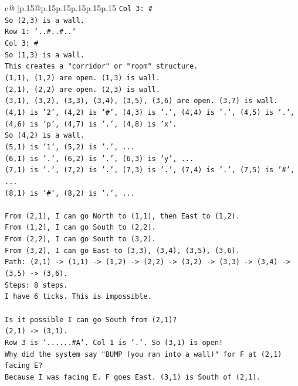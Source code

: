 \documentclass{article}
\begin{document}
{\begin{supertabular}{c@{$\;$}|p{.15\linewidth}@{}p{.15\linewidth}p{.15\linewidth}p{.15\linewidth}p{.15\linewidth}p{.15\linewidth}}
{{{\texttt{Col 3: \#} \\
\texttt{So (2,3) is a wall.} \\
\texttt{Row 1: `..\#..\#..`} \\
\texttt{Col 3: \#} \\
\texttt{So (1,3) is a wall.} \\
\texttt{This creates a "corridor" or "room" structure.} \\
\texttt{(1,1), (1,2) are open. (1,3) is wall.} \\
\texttt{(2,1), (2,2) are open. (2,3) is wall.} \\
\texttt{(3,1), (3,2), (3,3), (3,4), (3,5), (3,6) are open. (3,7) is wall.} \\
\texttt{(4,1) is '2', (4,2) is '\#', (4,3) is '.', (4,4) is '.', (4,5) is '.', (4,6) is 'p', (4,7) is '.', (4,8) is 'x'.} \\
\texttt{So (4,2) is a wall.} \\
\texttt{(5,1) is '1', (5,2) is '.', ...} \\
\texttt{(6,1) is '.', (6,2) is '.', (6,3) is 'y', ...} \\
\texttt{(7,1) is '.', (7,2) is '.', (7,3) is '.', (7,4) is '.', (7,5) is '\#', ...} \\
\texttt{(8,1) is '\#', (8,2) is '.', ...} \\
\\ 
\texttt{From (2,1), I can go North to (1,1), then East to (1,2).} \\
\texttt{From (1,2), I can go South to (2,2).} \\
\texttt{From (2,2), I can go South to (3,2).} \\
\texttt{From (3,2), I can go East to (3,3), (3,4), (3,5), (3,6).} \\
\texttt{Path: (2,1) {-}> (1,1) {-}> (1,2) {-}> (2,2) {-}> (3,2) {-}> (3,3) {-}> (3,4) {-}> (3,5) {-}> (3,6).} \\
\texttt{Steps: 8 steps.} \\
\texttt{I have 6 ticks. This is impossible.} \\
\\ 
\texttt{Is it possible I can go South from (2,1)?} \\
\texttt{(2,1) {-}> (3,1).} \\
\texttt{Row 3 is `......\#A`. Col 1 is `.`. So (3,1) is open!} \\
\texttt{Why did the system say "BUMP (you ran into a wall)" for F at (2,1) facing E?} \\
\texttt{Because I was facing E. F goes East. (3,1) is South of (2,1).} \\
}}}
\end{supertabular}}
\end{document}
